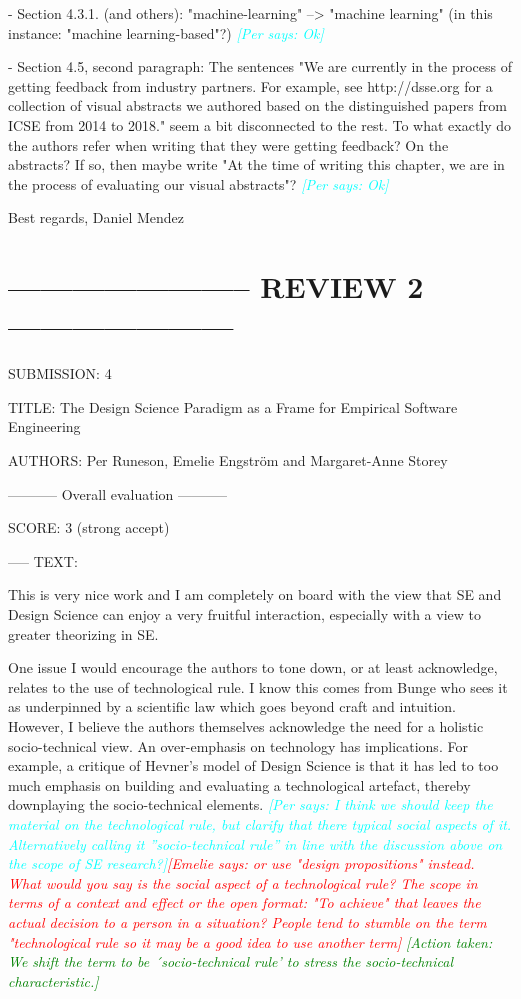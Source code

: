 \documentclass{article}
\newcommand{\emelie}[1]{\textcolor{red}{{\it [Emelie says: #1]}}}
\newcommand{\per}[1]{\textcolor{cyan}{{\it [Per says: #1]}}}
\newcommand{\action}[1]{\textcolor{green}{{\it [Action taken: #1]}}}
\newcommand{\emelie}[1]{}
\newcommand{\per}[1]{}
\newcommand{\action}[1]{}
\begin{document}
- Section 4.3.1. (and others): "machine-learning" --> "machine learning" (in this instance: "machine learning-based"?) \per{Ok}

- Section 4.5, second paragraph: The sentences "We are currently in the process of getting feedback from industry partners. For example, see http://dsse.org for a collection of visual abstracts we authored based on the distinguished papers from ICSE from 2014 to 2018." seem a bit disconnected to the rest. To what exactly do the authors refer when writing that they were getting feedback? On the abstracts? If so, then maybe write "At the time of writing this chapter, we are in the process of evaluating our visual abstracts"? \per{Ok}

Best regards, 
Daniel Mendez



\section*{----------------------- REVIEW 2 ---------------------}
SUBMISSION: 4

TITLE: The Design Science Paradigm as a Frame for Empirical Software Engineering

AUTHORS: Per Runeson, Emelie Engström and Margaret-Anne Storey

----------- Overall evaluation -----------

SCORE: 3 (strong accept)

----- TEXT:

This is very nice work and I am completely on board with the view that SE and Design Science can enjoy a very fruitful interaction, especially with a view to greater theorizing in SE.


One issue I would encourage the authors to tone down, or at least acknowledge, relates to the use of technological rule. I know this comes from Bunge who sees it as underpinned by a scientific law which goes beyond craft and intuition. However, I believe the authors themselves acknowledge the need for a holistic socio-technical view. An over-emphasis on technology has implications. For example, a critique of Hevner’s model of Design Science is that it has led to too much emphasis on building and evaluating a technological artefact, thereby downplaying the socio-technical elements. \per{I think we should keep the material on the technological rule, but clarify that there typical social aspects of it. Alternatively calling it ''socio-technical rule'' in line with the discussion above on the scope of SE research?}\emelie{or use "design propositions" instead. What would you say is the social aspect of a technological rule? The scope in terms of a context and effect or the open format: "To achieve" that leaves the actual decision to a person in a situation? People tend to stumble on the term "technological rule so it may be a good idea to use another term}
\action{We shift the term to be ´socio-technical rule' to stress the socio-technical characteristic.}
\end{document}
